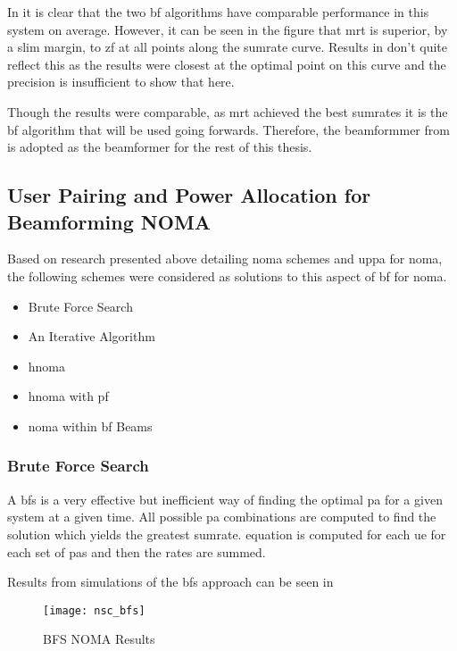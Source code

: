 \par
In  it is clear that the two \ac{bf} algorithms have comparable performance in this system on average.
However, it can be seen in the figure that \ac{mrt} is superior, by a slim margin, to \ac{zf} at all points along the sumrate curve.
Results in  don't quite reflect this as the results were closest at the optimal point on this curve and the precision is insufficient to show that here.

\par
Though the results were comparable, as \ac{mrt} achieved the best sumrates it is the \ac{bf} algorithm that will be used going forwards.
Therefore, the beamformmer from  is adopted as the beamformer for the rest of this thesis.

\subsection{User Pairing and Power Allocation for Beamforming NOMA}
\label{sec:uppabf}
Based on research presented above detailing \ac{noma} schemes and \ac{uppa} for \ac{noma}, the following schemes were considered as solutions to this aspect of \ac{bf} for \ac{noma}.

\begin{itemize}
	\item Brute Force Search
	\item An Iterative Algorithm
	\item \ac{hnoma}
	\item \ac{hnoma} with \ac{pf}
	\item \ac{noma} within \ac{bf} Beams
\end{itemize}

\subsubsection{Brute Force Search}
A \ac{bfs} is a very effective but inefficient way of finding the optimal \ac{pa} for a given system at a given time.
All possible \ac{pa} combinations are computed to find the solution which yields the greatest sumrate.
 equation is computed for each \ac{ue} for each set of \acp{pa} and then the rates are summed.

\par
Results from simulations of the \ac{bfs} approach can be seen in 

\begin{figure}[htb!]
	\centering
	\texttt{[image: nsc\_bfs]}
	\caption{BFS NOMA Results}
	\label{fig:nsc_bfs}
\end{figure}

